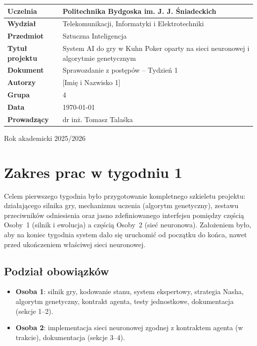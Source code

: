 \documentclass[12pt,a4paper]{article}
\begin{document}
\thispagestyle{empty}
\begin{center}
\begin{tabular}{|p{5cm}|p{9cm}|}
\hline
\textbf{Uczelnia} & Politechnika Bydgoska im. J. J. Śniadeckich \\ \hline
\textbf{Wydział} & Telekomunikacji, Informatyki i Elektrotechniki \\ \hline
\textbf{Przedmiot} & Sztuczna Inteligencja \\ \hline
\textbf{Tytuł projektu} & System AI do gry w Kuhn Poker oparty na sieci neuronowej i algorytmie genetycznym \\ \hline
\textbf{Dokument} & Sprawozdanie z postępów -- Tydzień 1 \\ \hline
\textbf{Autorzy} & [Imię i Nazwisko 1]  \\ \hline
\textbf{Grupa} & 4 \\ \hline
\textbf{Data} & \today \\ \hline
\textbf{Prowadzący} & dr inż. Tomasz Talaśka \\ \hline
\end{tabular}
\end{center}
\vfill
\begin{center}
\Large Rok akademicki 2025/2026
\end{center}
\newpage

\section{Zakres prac w tygodniu 1}

Celem pierwszego tygodnia było przygotowanie kompletnego szkieletu
projektu: działającego silnika gry, mechanizmu uczenia (algorytm
genetyczny), zestawu przeciwników odniesienia oraz jasno zdefiniowanego
interfejsu pomiędzy częścią Osoby~1 (silnik i ewolucja) a częścią
Osoby~2 (sieć neuronowa). Założeniem było, aby na koniec tygodnia
system dało się uruchomić od początku do końca, nawet przed
ukończeniem właściwej sieci neuronowej.

\subsection*{Podział obowiązków}
\begin{itemize}[nosep]
    \item \textbf{Osoba 1}: silnik gry, kodowanie stanu, system ekspertowy,
          strategia Nasha, algorytm genetyczny, kontrakt agenta, testy
          jednostkowe, dokumentacja (sekcje 1--2).
    \item \textbf{Osoba 2}: implementacja sieci neuronowej zgodnej z
          kontraktem agenta (w trakcie), dokumentacja (sekcje 3--4).
\end{itemize}
\end{document}
